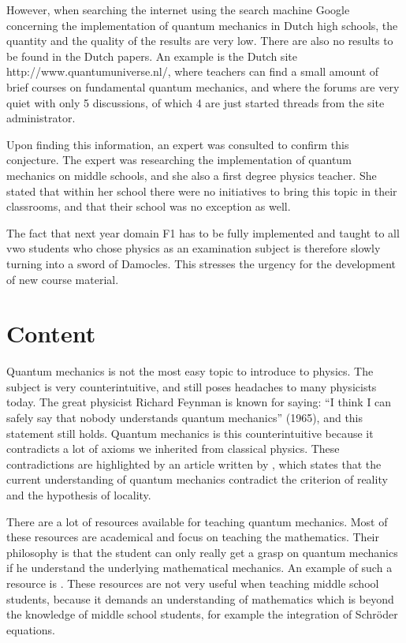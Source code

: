 \documentclass[12pt]{report} %
\begin{document}
However, when searching the internet using the search machine Google concerning the implementation of quantum mechanics in Dutch high schools, the quantity and the quality of the results are very low. There are also no results to be found in the Dutch papers. An example is the Dutch site http://www.quantumuniverse.nl/, where teachers can find a small amount of brief courses on fundamental quantum mechanics, and where the forums are very quiet with only 5 discussions, of which 4 are just started threads from the site administrator.

Upon finding this information, an expert was consulted to confirm this conjecture. The expert was researching the implementation of quantum mechanics on middle schools, and she also a first degree physics teacher. She stated that within her school there were no initiatives to bring this topic in their classrooms, and that their school was no exception as well.

The fact that next year domain F1 has to be fully implemented and taught to all vwo students who chose physics as an examination subject is therefore slowly turning into a sword of Damocles. This stresses the urgency for the development of new course material.

\section{Content}

Quantum mechanics is not the most easy topic to introduce to physics. The subject is very counterintuitive, and still poses headaches to many physicists today. The great physicist Richard Feynman is known for saying: “I think I can safely say that nobody understands quantum mechanics” (1965), and this statement still holds. Quantum mechanics is this counterintuitive because it contradicts a lot of axioms we inherited from classical physics. These contradictions are highlighted by an article written by , which states that the current understanding of quantum mechanics contradict the criterion of reality and the hypothesis of locality.

There are a lot of resources available for teaching quantum mechanics. Most of these resources are academical and focus on teaching the mathematics. Their philosophy is that the student can only really get a grasp on quantum mechanics if he understand the underlying mathematical mechanics. An example of such a resource is . These resources are not very useful when teaching middle school students, because it demands an understanding of mathematics which is beyond the knowledge of middle school students, for example the integration of Schröder equations.
\end{document}
